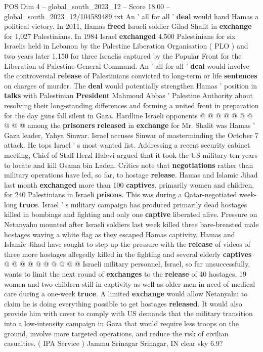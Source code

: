 \begin{textsample}{POS Dim 4 – global\_south\_2023\_12 – Score 18.00 – global\_south\_2023\_12/104589489.txt}
An ' all for all ' \textbf{deal} would hand Hamas a political victory.
In 2011, Hamas \textbf{freed} Israeli soldier Gilad Shalit in \textbf{exchange} for 1,027 Palestinians.
In 1984 Israel \textbf{exchanged} 4,500 Palestinians for six Israelis held in Lebanon by the Palestine Liberation Organisation ( PLO ) and two years later 1,150 for three Israelis captured by the Popular Front for the Liberation of Palestine-General Command.
An ' all for all ' \textbf{deal} would involve the controversial \textbf{release} of Palestinians convicted to long-term or life \textbf{sentences} on charges of murder.
The \textbf{deal} would potentially strengthen Hamas ' position in \textbf{talks} with Palestinian \textbf{President} Mahmoud Abbas ' Palestine Authority about resolving their long-standing differences and forming a united front in preparation for the day guns fall silent in Gaza.
Hardline Israeli opponents @ @ @ @ @ @ @ @ @ @ among the \textbf{prisoners} \textbf{released} in \textbf{exchange} for Mr.
Shalit was Hamas ' Gaza leader, Yahya Sinwar.
Israel accuses Sinwar of masterminding the October 7 attack.
He tops Israel ' s most-wanted list.
Addressing a recent security cabinet meeting, Chief of Staff Herzl Halevi argued that it took the US military ten years to locate and kill Osama bin Laden.
Critics note that \textbf{negotiations} rather than military operations have led, so far, to hostage \textbf{release}.
Hamas and Islamic Jihad last month \textbf{exchanged} more than 100 \textbf{captives}, primarily women and children, for 240 Palestinians in Israeli \textbf{prisons}.
This was during a Qatar-negotiated week-long \textbf{truce}.
Israel ' s military campaign has produced primarily dead hostages killed in bombings and fighting and only one \textbf{captive} liberated alive.
Pressure on Netanyahu mounted after Israeli soldiers last week killed three bare-breasted male hostages waving a white flag as they escaped Hamas captivity.
Hamas and Islamic Jihad have sought to step up the pressure with the \textbf{release} of videos of three more hostages allegedly killed in the fighting and several elderly \textbf{captives} @ @ @ @ @ @ @ @ @ @ Israeli military personnel, Israel, so far unsuccessfully, wants to limit the next round of \textbf{exchanges} to the \textbf{release} of 40 hostages, 19 women and two children still in captivity as well as older men in need of medical care during a one-week \textbf{truce}.
A limited \textbf{exchange} would allow Netanyahu to claim he is doing everything possible to get hostages \textbf{released}.
It would also provide him with cover to comply with US demands that the military transition into a low-intensity campaign in Gaza that would require less troops on the ground, involve more targeted operations, and reduce the risk of civilian casualties. ( IPA Service ) Jammu Srinagar Srinagar, IN clear sky 6.9?

\end{textsample}
